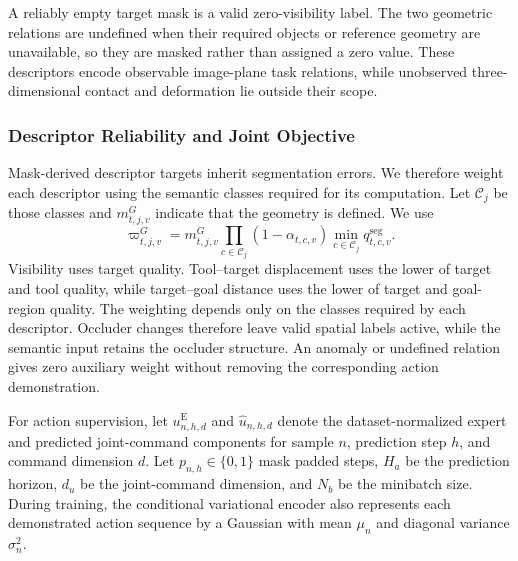 A reliably empty target mask is a valid zero-visibility label.
The two geometric relations are undefined when their required objects or reference geometry are unavailable, so they are masked rather than assigned a zero value.
These descriptors encode observable image-plane task relations, while unobserved three-dimensional contact and deformation lie outside their scope.

\subsubsection{Descriptor Reliability and Joint Objective}
Mask-derived descriptor targets inherit segmentation errors.
We therefore weight each descriptor using the semantic classes required for its computation.
Let $\mathcal C_j$ be those classes and $m_{t,j,v}^{G}$ indicate that the geometry is defined.
We use
\begin{equation}
 \varpi_{t,j,v}^{G}
 =m_{t,j,v}^{G}
  \prod_{c\in\mathcal C_j}(1-\alpha_{t,c,v})
  \min_{c\in\mathcal C_j}q_{t,c,v}^{\mathrm{seg}}.
 \label{eq:relationadmission}
\end{equation}
Visibility uses target quality.
Tool--target displacement uses the lower of target and tool quality, while target--goal distance uses the lower of target and goal-region quality.
The weighting depends only on the classes required by each descriptor.
Occluder changes therefore leave valid spatial labels active, while the semantic input retains the occluder structure.
An anomaly or undefined relation gives zero auxiliary weight without removing the corresponding action demonstration.

For action supervision, let $u_{n,h,d}^{\mathrm E}$ and $\widehat u_{n,h,d}$ denote the dataset-normalized expert and predicted joint-command components for sample $n$, prediction step $h$, and command dimension $d$.
Let $p_{n,h}\in\{0,1\}$ mask padded steps, $H_a$ be the prediction horizon, $d_u$ be the joint-command dimension, and $N_b$ be the minibatch size.
During training, the conditional variational encoder also represents each demonstrated action sequence by a Gaussian with mean $\mu_n$ and diagonal variance $\sigma_n^2$.

